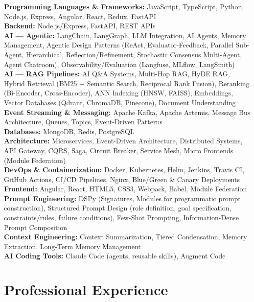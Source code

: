 \documentclass[a4paper,11pt]{article}
\begin{document}
\textbf{Programming Languages \& Frameworks:} JavaScript, TypeScript, Python, Node.js, Express, Angular, React, Redux, FastAPI \\[2pt]
\textbf{Backend:} Node.js/Express, FastAPI, REST APIs \\[2pt]
\textbf{AI --- Agentic:} LangChain, LangGraph, LLM Integration, AI Agents, Memory Management, Agentic Design Patterns (ReAct, Evaluator-Feedback, Parallel Sub-Agent, Hierarchical, Reflection/Refinement, Stochastic Consensus Multi-Agent, Agent Chatroom), Observability/Evaluation (Langfuse, MLflow, LangSmith) \\[2pt]
\textbf{AI --- RAG Pipelines:} AI Q\&A Systems, Multi-Hop RAG, HyDE RAG, Hybrid Retrieval (BM25 + Semantic Search, Reciprocal Rank Fusion), Reranking (Bi-Encoder, Cross-Encoder), ANN Indexing (HNSW, FAISS), Embeddings, Vector Databases (Qdrant, ChromaDB, Pinecone), Document Understanding \\[2pt]
\textbf{Event Streaming \& Messaging:} Apache Kafka, Apache Artemis, Message Bus Architecture, Queues, Topics, Event-Driven Patterns \\[2pt]
\textbf{Databases:} MongoDB, Redis, PostgreSQL \\[2pt]
\textbf{Architecture:} Microservices, Event-Driven Architecture, Distributed Systems, API Gateway, CQRS, Saga, Circuit Breaker, Service Mesh, Micro Frontends (Module Federation) \\[2pt]
\textbf{DevOps \& Containerization:} Docker, Kubernetes, Helm, Jenkins, Travis CI, GitHub Actions, CI/CD Pipelines, Nginx, Blue/Green \& Canary Deployments \\[2pt]
\textbf{Frontend:} Angular, React, HTML5, CSS3, Webpack, Babel, Module Federation \\[2pt]
\textbf{Prompt Engineering:} DSPy (Signatures, Modules for programmatic prompt construction), Structured Prompt Design (role definition, goal specification, constraints/rules, failure conditions), Few-Shot Prompting, Information-Dense Prompt Composition \\[2pt]
\textbf{Context Engineering:} Context Summarization, Tiered Condensation, Memory Extraction, Long-Term Memory Management \\[2pt]
\textbf{AI Coding Tools:} Claude Code (agents, reusable skills), Augment Code

\section{Professional Experience}
\end{document}
